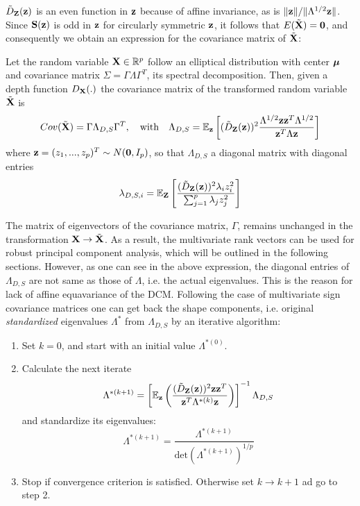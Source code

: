 \documentclass[fleqn,11pt]{article}
\begin{document}
$\tilde D_{\mathbf{Z}}({\bf{z}})$ is an even function in ${\bf{z}}$ because of affine invariance, as is $\| {\bf{z}} \| / \|\Lambda^{1/2} {\bf{z}} \|$. Since ${\mathbf{S}}({\bf{z}})$ is odd in ${\bf{z}}$ for circularly symmetric ${\bf{z}}$, it follows that $E(\tilde {{\mathbf{X}}}) = \bf0$, and consequently we obtain an expression for the covariance matrix of $\tilde {{\mathbf{X}}}$:

\begin{Theorem} \label{Theorem:covform}
Let the random variable ${\mathbf{X}} \in \mathbb{R}^p$ follow an elliptical distribution with center ${\boldsymbol{\mu}}$ and covariance matrix $\Sigma = \Gamma\Lambda\Gamma^T$, its spectral decomposition. Then, given a depth function $D_{\mathbf{X}}(.)$ the covariance matrix of the transformed random variable $\tilde{{\mathbf{X}}}$ is
\begin{equation} \label{equation:covformEq1}
Cov(\tilde {{\mathbf{X}}}) = \Gamma \Lambda_{D,S} \Gamma^T,\quad\mbox{with}\quad \Lambda_{D,S} = \mathbb E_{\bf{z}} \left[ (\tilde D_{\mathbf{Z}}({\bf{z}}))^2 \frac{\Lambda^{1/2} {\bf{z}} {\bf{z}}^T \Lambda^{1/2}}{{\bf{z}}^T \Lambda {\bf{z}}} \right]
\end{equation}
where ${\bf{z}} = (z_1,...,z_p)^T \sim N({\bf 0}, I_p)$, so that $\Lambda_{D,S}$ a diagonal matrix with diagonal entries
%
$$ \lambda_{D,S,i} = \mathbb E_{\mathbf{Z}} \left[ \frac{(\tilde D_{\mathbf{Z}}({\bf{z}}))^2 \lambda_i z_i^2}{\sum_{j=1}^p \lambda_j z_j^2} \right] $$
\end{Theorem}

The matrix of eigenvectors of the covariance matrix, $\Gamma$, remains unchanged in the transformation ${\mathbf{X}} \rightarrow \tilde {{\mathbf{X}}}$. As a result, the multivariate rank vectors can be used for robust principal component analysis, which will be outlined in the following sections. However, as one can see in the above expression, the diagonal entries of $\Lambda_{D,S}$ are not same as those of $\Lambda$, i.e. the actual eigenvalues. This is the reason for lack of affine equavariance of the DCM. Following the case of multivariate sign covariance matrices \citep{taskinen12} one can get back the shape components, i.e. original \textit{standardized} eigenvalues $\Lambda^*$ from $\Lambda_{D,S}$ by an iterative algorithm:

\begin{enumerate}
\item Set $k=0$, and start with an initial value $\Lambda^{*(0)}$.

\item Calculate the next iterate
%
$$ \Lambda^{*(k+1)} = \left[ \mathbb E_{\bf{z}} \left( \frac{(\tilde D_{\mathbf{Z}}({\bf{z}}))^2 {\bf{z}} {\bf{z}}^T}{{\bf{z}}^T \Lambda^{*(k)} {\bf{z}}} \right) \right]^{-1} \Lambda_{D,S} $$
and standardize its eigenvalues:
%
$$ \Lambda^{*(k+1)} = \frac{\Lambda^{*(k+1)}}{\text{det} (\Lambda^{*(k+1)})^{1/p}} $$
%
\item Stop if convergence criterion is satisfied. Otherwise set $k \rightarrow k+1$ ad go to step 2.
\end{enumerate}
\end{document}
